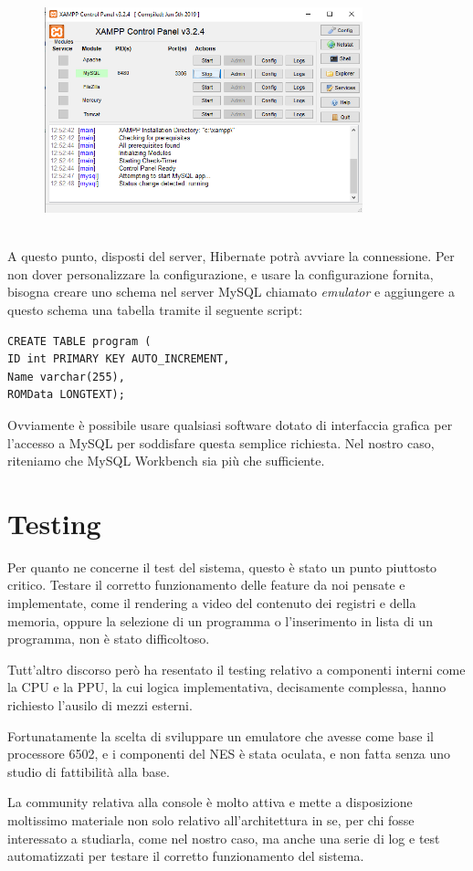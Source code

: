 \documentclass[11pt]{article}
\begin{document}
\begin{figure}[h]
\centering
\includegraphics[width=350px, height=225px]{XAMPP.png}
\end{figure}\\
A questo punto, disposti del server, Hibernate potrà avviare la connessione. Per non dover personalizzare la configurazione, e usare la configurazione fornita, bisogna creare uno schema nel server MySQL chiamato \emph{emulator} e aggiungere a questo schema una tabella tramite il seguente script:
\begin{lstlisting}
CREATE TABLE program (    
ID int PRIMARY KEY AUTO_INCREMENT,     
Name varchar(255),    
ROMData LONGTEXT);
\end{lstlisting}
Ovviamente è possibile usare qualsiasi software dotato di interfaccia grafica per l'accesso a MySQL per soddisfare questa semplice richiesta. Nel nostro caso, riteniamo che MySQL Workbench sia più che sufficiente.
\clearpage
\section{Testing}
Per quanto ne concerne il test del sistema, questo è stato un punto piuttosto critico. Testare il corretto funzionamento delle feature da noi pensate e implementate, come il rendering a video del contenuto dei registri e della memoria, oppure la selezione di un programma o l'inserimento in lista di un programma, non è stato difficoltoso.

Tutt'altro discorso però ha resentato il testing relativo a componenti interni come la CPU e la PPU, la cui logica implementativa, decisamente complessa, hanno richiesto l'ausilo di mezzi esterni.

Fortunatamente la scelta di sviluppare un emulatore che avesse come base il processore 6502, e i componenti del NES è stata oculata, e non fatta senza uno studio di fattibilità alla base.

La community relativa alla console è molto attiva e mette a disposizione moltissimo materiale non solo relativo all'architettura in se, per chi fosse interessato a studiarla, come nel nostro caso, ma anche una serie di log e test automatizzati per testare il corretto funzionamento del sistema.
\end{document}
